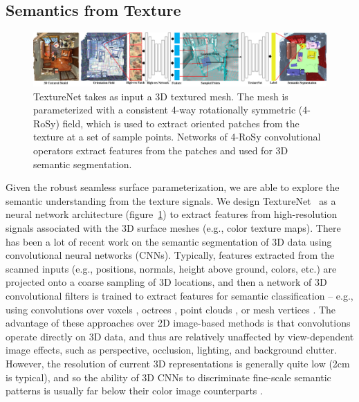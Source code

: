 \subsection{Semantics from Texture}
\begin{figure}
    \begin{center}
        \includegraphics[width=\linewidth]{texturenet/teaser/teaser.pdf}
        \caption{TextureNet takes as input a 3D textured mesh.  The mesh is parameterized with a consistent 4-way rotationally symmetric (4-RoSy) field, which is used to extract oriented patches from the texture at a set of sample points.   Networks of 4-RoSy convolutional operators extract features from the patches and used for 3D semantic segmentation.}
        \label{fig:texturenet-teaser}
    \end{center}    
\end{figure}
\label{intro:texture-learn}
Given the robust seamless surface parameterization, we are able to explore the semantic understanding from the texture signals. We design TextureNet~\cite{huang2018texturenet} as a neural network architecture (figure~\ref{fig:texturenet-teaser}) to extract features from high-resolution signals associated with the 3D surface meshes (e.g., color texture maps).
There has been a lot of recent work on the semantic segmentation of 3D data using convolutional neural networks (CNNs).  Typically, features extracted from the scanned inputs (e.g., positions, normals, height above ground, colors, etc.) are projected onto a coarse sampling of 3D locations, and then a network of 3D convolutional filters is trained to extract features for semantic classification -- e.g., using convolutions over voxels \cite{wu20153d,maturana2015voxnet,qi2016volumetric,song2017semantic,dai2017scannet,dai2018scancomplete}, octrees \cite{riegler2017octnet}, point clouds \cite{qi2017pointnet,qi2017pointnet++}, or mesh vertices \cite{masci2015geodesic}.  The advantage of these approaches over 2D image-based methods is that convolutions operate directly on 3D data, and thus are relatively unaffected by view-dependent image effects, such as perspective, occlusion, lighting, and background clutter.   However, the resolution of current 3D representations is generally quite low (2cm is typical), and so the ability of 3D CNNs to discriminate fine-scale semantic patterns is usually far below their color image counterparts \cite{long2015fully,he2017mask}.

